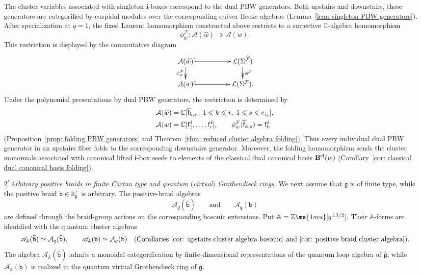 \documentclass[12pt, leqno]{amsart}
\numberwithin{equation}{section}
\theoremstyle{plain}
\theoremstyle{definition}
\renewcommand{\le}{\leqslant}
\newcommand{\g}{\mathfrak{g}}
\newcommand{\C}{\mathbb{C}}
\newcommand{\Z}{\mathbb{Z}\ms{1mu}}
\newcommand{\ii}{ \textbf{\textit{i}}}
\newcommand{\hg}{{\widehat{\g}}}
\newcommand{\hw}{\widehat{w}}
\newcommand{\sff}{\mathsf{f}}
\newcommand{\hsff}{\widehat{\sff}}
\newcommand{\bbA}{\mathbb{A}}
\newcommand{\bfB}{\mathbf{B}}
\newcommand{\bfi}{\mathbf{i}}
\newcommand{\calA}{\mathcal{A}}
\newcommand{\calF}{\mathcal{F}}
\newcommand{\calL}{\mathcal{L}}
\newcommand{\hcalF}{{\widehat{\calF}}}
\newcommand{\scrA}{\mathscr{A}}
\newcommand{\ttB}{\mathtt{B}}
\newcommand{\ttb}{\mathtt{b}}
\newcommand{\httb}{\widehat{\ttb}}
\begin{document}
The cluster variables associated with singleton $\bfi$-boxes
correspond to the dual PBW generators. Both upstairs and downstairs, these
generators are categorified by cuspidal modules over the corresponding
quiver Hecke algebras (Lemma~\ref{lem: singleton PBW generators}). After
specialization at $q=1$, the fixed Laurent homomorphism
constructed above restricts to a surjective $\C$-algebra homomorphism
\[
\phi^\calF_w: \calA(\hw)\twoheadrightarrow\calA(w).
\]
This restriction is displayed by the commutative diagram
\[
\xymatrix@C=5em@R=1.5em{
\calA(\hw) \ar@{^{(}->}[r] \ar@{->>}[d]_{\phi^\calF_w} & \calL(\Sigma^{\hcalF}) \ar@{->>}[d]^{\phi^\calF}\\
\calA(w) \ar@{^{(}->}[r] & \calL(\Sigma^\calF).
}
\]
Under the polynomial presentations by dual PBW generators, the
restriction is determined by
\[
\begin{aligned}
\calA(\hw)&=\C[\hsff_{k,s}\mid 1\le k\le r,\ 1\le s\le e_{i_k}],\\
\calA(w) &= \C[\sff_1^\ii,\ldots,\sff_r^\ii], \qquad \phi^\calF_w(\hsff_{k,s})=\sff_k^\ii
\end{aligned}
\]
(Proposition~\ref{prop: folding PBW generators} and
Theorem~\ref{thm: reduced cluster algebra folding}).
Thus every individual dual PBW generator in an upstairs fiber 
folds to the corresponding downstairs
generator. Moreover, the folding homomorphism sends the cluster monomials
associated with  canonical lifted {}$\bfi$-box seeds to elements of the classical dual
canonical basis $\bfB^{\rm cl}(w)$
(Corollary~\ref{cor: classical dual canonical basis folding}).



\medskip
\noindent
$\boxed{2}^*$\emph{Arbitrary positive braids in finite Cartan type and
quantum $($virtual$)$ Grothendieck rings.}
We next assume that $\g$ is of finite type, while the positive braid
$\ttb\in\ttB_\g^+$ is arbitrary. The positive-braid algebras
\[
\scrA_q(\httb)
\qquad\text{and}\qquad
\scrA_q(\ttb)
\]
are defined through the braid-group actions on the corresponding
bosonic extensions. 
Put $\bbA=\Z[q^{\pm1/2}]$. 
Their $\bbA$-forms are identified with the quantum
cluster algebras
\[
\scrA_{\bbA}(\httb)\simeq\calA_q(\httb),
\qquad 
\scrA_{\bbA}(\ttb) \simeq\calA_q(\ttb) \quad
\text{(Corollaries~\ref{cor: upstairs cluster algebra bosonic}
and~\ref{cor: positive braid cluster algebra})}.
\]
 The algebra $\scrA_{\bbA}(\httb)$ admits a monoidal categorification
by finite-dimensional representations of the quantum loop algebra
of $\hg$, while $\scrA_{\bbA}(\ttb)$ is realized in the quantum
virtual Grothendieck ring of $\g$.
\end{document}
